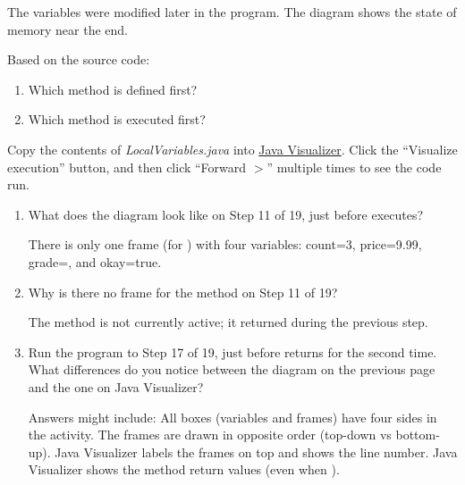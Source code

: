 \documentclass[12pt]{article}
\begin{document}
\begin{answer}[3em]
The variables were modified later in the program.
The diagram shows the state of memory near the end.
\end{answer}


\Q Based on the source code:

\begin{enumerate}
\item Which method is defined first? 
\item Which method is executed first? 
\end{enumerate}


%


\Q Copy the contents of \textit{LocalVariables.java} into \href{https://cscircles.cemc.uwaterloo.ca/java_visualize/#code=public+class+ClassNameHere+%7B%0A++++public+static+void+main(String%5B%5D+args)+%7B%0A++++++++%0A++++%7D%0A%7D&mode=edit&showStringsAsObjects=1}{Java Visualizer}.
Click the ``Visualize execution'' button, and then click ``Forward $>$'' multiple times to see the code run.

\begin{enumerate}

\item What does the diagram look like on Step 11 of 19, just before  executes?

\begin{answer}[3em]
There is only one frame (for ) with four variables:
count=3, price=9.99, grade=, and okay=true.
\end{answer}

\item Why is there no frame for the  method on Step 11 of 19?

\begin{answer}[3em]
The method is not currently active; it returned during the previous step.
\end{answer}

\item Run the program to Step 17 of 19, just before  returns for the second time.
What differences do you notice between the diagram on the previous page and the one on Java Visualizer?

\begin{answer}[6em]
Answers might include:
\bull All boxes (variables and frames) have four sides in the activity.
\bull The frames are drawn in opposite order (top-down vs bottom-up).
\bull Java Visualizer labels the frames on top and shows the line number.
\bull Java Visualizer shows the method return values (even when ).
\end{answer}

\end{enumerate}
\end{document}
